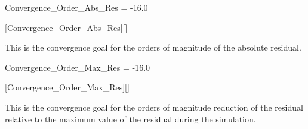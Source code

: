 
\begin{nmldescitem}
Convergence_Order_Abs_Res = -16.0
\end{nmldescitem}
[Convergence\_Order\_Abs\_Res][]

\begin{nmldescbody}
This is the convergence goal for the orders of magnitude of the absolute
residual.
\end{nmldescbody}


\begin{nmldescitem}
Convergence_Order_Max_Res = -16.0
\end{nmldescitem}
[Convergence\_Order\_Max\_Res][]

\begin{nmldescbody}
This is the convergence goal for the orders of magnitude reduction of the
residual relative to the maximum value of the residual during the
simulation.
\end{nmldescbody}


